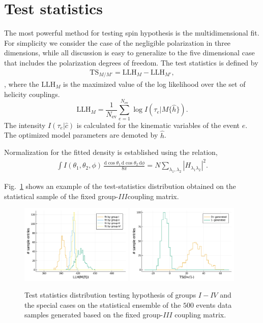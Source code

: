 \documentclass[prd,preprintnumbers,floatfix,
nofootinbib,superscriptaddress]{revtex4}
\newcommand{\diff}{\mathrm{d}}
\newcommand{\TS}{\mathrm{TS}}
\newcommand{\LLH}{\mathrm{LLH}}
\newcommand{\I}{\ensuremath{I}}
\newcommand{\III}{\ensuremath{{I\!I\!I}}}
\newcommand{\IV}{\ensuremath{{I\!V}}}
\begin{document}
\section{Test statistics}
The most powerful method for testing spin hypothesis is the multidimensional fit.
For simplicity we consider the case of the negligible polarization in three dimensions, while all discussion is easy to generalize to the five dimensional case that includes
the polarization degrees of freedom.
The test statistics is defined by
\begin{align}
  \TS_{M/M'} = \LLH_M - \LLH_{M'},
\end{align},
where the $\LLH_M$ is the maximized value of the log likelihood over the set of helicity couplings.
\begin{equation}
  \LLH_M = \frac{1}{N_\mathrm{ev}} \sum_{e=1}^{N_\mathrm{ev}} \log I(\tau_e|M\{\hat{h}\}).
\end{equation}
The intensity $I(\tau_e|\hat{c})$ is calculated for the kinematic variables of the event $e$.
The optimized model parameters are demoted by $\hat{h}$.

Normalization for the fitted density is established using the relation,
\begin{align}
  \int I(\theta_1,\theta_2,\phi)\,\frac{\diff\cos\theta_1\,\diff\cos\theta_2\,\diff \phi}{8\pi} = N \sum_{\lambda_1,\lambda_2} |H_{\lambda_1\lambda_2}|^2.
\end{align}

Fig.~\ref{fig:TS.fixedH} shows an example of the test-statistics distribution obtained on the statistical sample of the fixed group-\III coupling matrix.

\begin{figure}
  \includegraphics[width=0.48\textwidth]{../plots/llh_testing_higgs.pdf}
  \includegraphics[width=0.48\textwidth]{../plots/TS_0p_vs_1m.pdf}
  \caption{Test statistics distribution testing hypothesis of groups $\I-\IV$ and the special cases on the statistical ensemble of the $500$ events data samples generated based on
  the fixed group-$\III$ coupling matrix. }
  \label{fig:TS.fixedH}
\end{figure}
\end{document}
